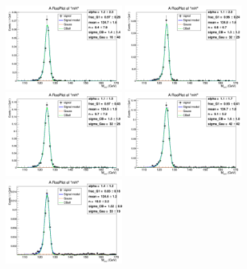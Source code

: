 \begin{figure}
	\begin{center}
		\includegraphics[width=0.40\textwidth]{fig/hmumu/2018/bkgfit_mu_ggF_1_125.png}
		\includegraphics[width=0.40\textwidth]{fig/hmumu/2018/bkgfit_mu_ggF_2_125.png}\\
		\includegraphics[width=0.40\textwidth]{fig/hmumu/2018/bkgfit_mu_ggF_3_125.png}
		\includegraphics[width=0.40\textwidth]{fig/hmumu/2018/bkgfit_mu_ggF_4_125.png}\\
		\includegraphics[width=0.40\textwidth]{fig/hmumu/2018/bkgfit_mu_VBF_501_125.png}

\end{center}
\end{figure}

